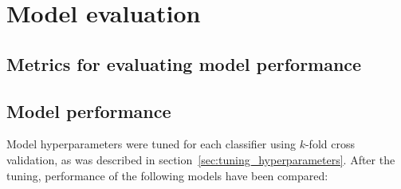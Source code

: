 \chapter{Model evaluation} \label{ch:model_evaluation}

\section{Metrics for evaluating model performance} \label{sec:model_metrics}

\section{Model performance} \label{sec:model_performance}

Model hyperparameters were tuned for each classifier using $k$-fold cross validation, as was described in section~\ref{sec:tuning_hyperparameters}.
After the tuning, performance of the following models have been compared:


